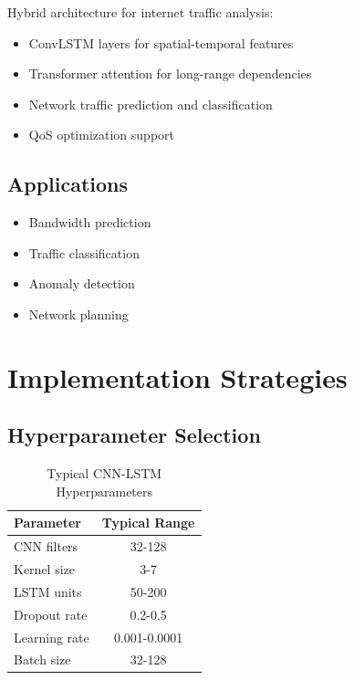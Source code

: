 \documentclass[12pt,a4paper]{article}
\begin{document}
Hybrid architecture for internet traffic analysis:
\begin{itemize}
    \item ConvLSTM layers for spatial-temporal features
    \item Transformer attention for long-range dependencies
    \item Network traffic prediction and classification
    \item QoS optimization support
\end{itemize}

\subsection{Applications}

\begin{itemize}
    \item Bandwidth prediction
    \item Traffic classification
    \item Anomaly detection
    \item Network planning
\end{itemize}

\section{Implementation Strategies}

\subsection{Hyperparameter Selection}

\begin{table}[H]
\centering
\caption{Typical CNN-LSTM Hyperparameters}
\begin{tabular}{lc}
\toprule
\textbf{Parameter} & \textbf{Typical Range} \\
\midrule
CNN filters & 32-128 \\
Kernel size & 3-7 \\
LSTM units & 50-200 \\
Dropout rate & 0.2-0.5 \\
Learning rate & 0.001-0.0001 \\
Batch size & 32-128 \\
\bottomrule
\end{tabular}
\end{table}
\end{document}
